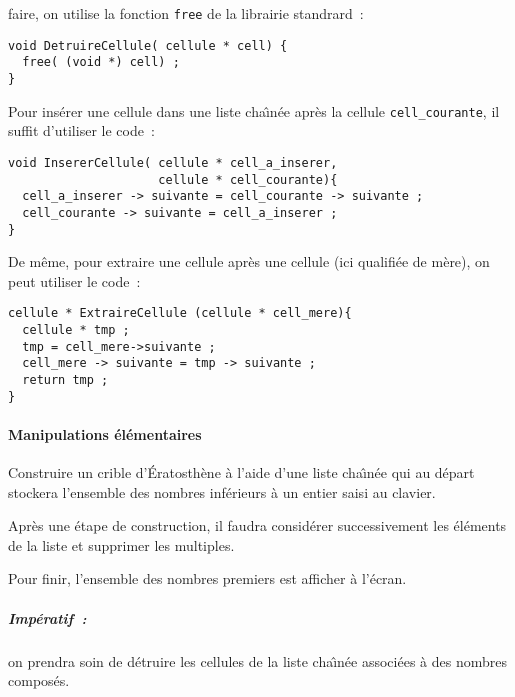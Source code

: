 \documentclass{article}
\begin{document}
faire, on   utilise  la   fonction  \texttt{free} de   la    librairie
standrard~:
\begin{verbatim}
void DetruireCellule( cellule * cell) {
  free( (void *) cell) ;
}
\end{verbatim}
Pour ins\'erer une cellule  dans  une liste cha\^\i{}n\'ee  apr\`es la
cellule \verb+cell_courante+, il suffit d'utiliser le code~:
\begin{verbatim}
void InsererCellule( cellule * cell_a_inserer, 
                     cellule * cell_courante){
  cell_a_inserer -> suivante = cell_courante -> suivante ;
  cell_courante -> suivante = cell_a_inserer ;
}
\end{verbatim}
De m\^eme,    pour  extraire une  cellule  apr\`es  une  cellule  (ici
qualifi\'ee de m\`ere), on peut utiliser le code~:
\begin{verbatim}
cellule * ExtraireCellule (cellule * cell_mere){
  cellule * tmp ;
  tmp = cell_mere->suivante ;
  cell_mere -> suivante = tmp -> suivante ;
  return tmp ;
}
\end{verbatim}
\paragraph{Manipulations \'el\'ementaires}
  Construire un  crible   d'\'Eratosth\`ene  \`a l'aide   d'une  liste
  cha\^\i{}n\'ee  qui  au d\'epart   stockera  l'ensemble  des nombres
  inf\'erieurs \`a un entier saisi au clavier.
  \par
  Apr\`es une \'etape   de     construction, il   faudra     consid\'erer
  successivement  les \'el\'ements  de  la   liste  et supprimer   les
  multiples.
  \par
  Pour   finir, l'ensemble  des  nombres   premiers  est afficher  \`a
  l'\'ecran.
  \subparagraph{Imp\'eratif~:}  
  on  prendra  soin     de  d\'etruire les   cellules     de  la liste
  cha\^\i{}n\'ee associ\'ees \`a des nombres compos\'es.
\end{document}
